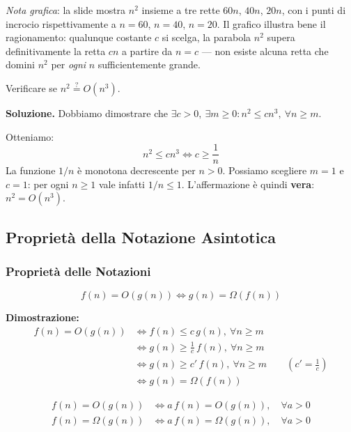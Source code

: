 \documentclass[12pt, a4paper]{article}
\begin{document}
\textit{Nota grafica}: la slide mostra $n^2$ insieme a tre rette $60n$, $40n$, $20n$, con i punti di incrocio rispettivamente a $n=60$, $n=40$, $n=20$. Il grafico illustra bene il ragionamento: qualunque costante $c$ si scelga, la parabola $n^2$ supera definitivamente la retta $cn$ a partire da $n=c$ --- non esiste alcuna retta che domini $n^2$ per \textit{ogni} $n$ sufficientemente grande.

\begin{tcolorbox}[colback=lightergray!10, colframe=tocsec, title=\textbf{Esercizio 4}]
Verificare se $n^2 \overset{?}{=} O(n^3)$.
\end{tcolorbox}

\textbf{Soluzione.} Dobbiamo dimostrare che $\exists c > 0,\ \exists m \ge 0 : n^2 \le cn^3,\ \forall n \ge m$.

Otteniamo:
$$n^2 \le cn^3 \iff c \ge \frac{1}{n}$$
La funzione $1/n$ è monotona decrescente per $n>0$. Possiamo scegliere $m=1$ e $c=1$: per ogni $n \ge 1$ vale infatti $1/n \le 1$. L'affermazione è quindi \textcolor{green!50!black}{\textbf{vera}}: $n^2 = O(n^3)$.



\subsection{Proprietà della Notazione Asintotica}
\label{sec:proprieta-notazione-asintotica}

\subsubsection{Proprietà delle Notazioni}

\begin{tcolorbox}[colback=lightergray!10, colframe=tocsec, title=\textbf{Proprietà: Dualità}]
\label{prop:dualita}
$$f(n) = O(g(n)) \iff g(n) = \Omega(f(n))$$
\end{tcolorbox}

\textbf{Dimostrazione:}
\begin{align*}
f(n) = O(g(n)) &\iff f(n) \le c\,g(n), \ \forall n \ge m \\
&\iff g(n) \ge \frac{1}{c}\,f(n), \ \forall n \ge m \\
&\iff g(n) \ge c'\,f(n), \ \forall n \ge m \qquad \left(c' = \frac{1}{c}\right) \\
&\iff g(n) = \Omega(f(n))
\end{align*}

\begin{tcolorbox}[colback=lightergray!10, colframe=tocsec, title=\textbf{Proprietà: Eliminazione delle Costanti}]
\label{prop:eliminazione-costanti}
\begin{align*}
f(n) = O(g(n)) &\iff a\,f(n) = O(g(n)), \quad \forall a > 0 \\
f(n) = \Omega(g(n)) &\iff a\,f(n) = \Omega(g(n)), \quad \forall a > 0
\end{align*}
\end{tcolorbox}
\end{document}
